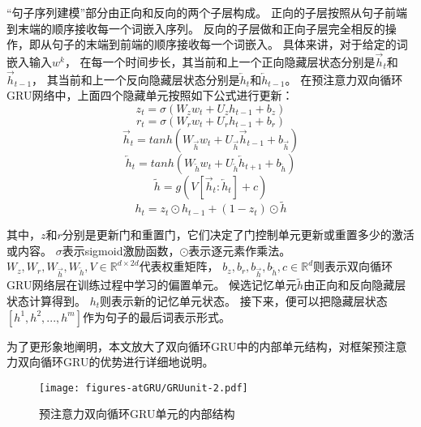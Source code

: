 “句子序列建模”部分由正向和反向的两个子层构成。
正向的子层按照从句子前端到末端的顺序接收每一个词嵌入序列。
反向的子层做和正向子层完全相反的操作，即从句子的末端到前端的顺序接收每一个词嵌入。
具体来讲，对于给定的词嵌入输入${w^k}$，
在每一个时间步长，其当前和上一个正向隐藏层状态分别是${\overrightarrow{h}_{t}}$和${\overrightarrow{h}_{t-1}}$，
其当前和上一个反向隐藏层状态分别是${\overleftarrow{h}_{t}}$和${\overleftarrow{h}_{t-1}}$。
在预注意力双向循环GRU网络中，上面四个隐藏单元按照如下公式进行更新：
\begin{equation}
z_{t}=\sigma\left(W_{z}w_{t}+U_{z}h_{t-1}+b_{z}\right)
\end{equation}
\begin{equation}
r_{t}=\sigma\left(W_{r}w_{t}+U_{r}h_{t-1}+b_{r}\right)
\end{equation}
\begin{equation}
\overrightarrow{h}_{t}=tanh\left(W_{\overrightarrow{h}}w_{t}+ U_{\overrightarrow{h}}\overrightarrow{h}_{t-1}+b_{\overrightarrow{h}}\right)
\end{equation}
\begin{equation}
\overleftarrow{h}_{t}=tanh\left(W_{\overleftarrow{h}}w_{t}+ U_{\overleftarrow{h}}\overleftarrow{h}_{t+1}+b_{\overleftarrow{h}}\right)
\end{equation}
\begin{equation}
\widetilde{h}=g\left(V\left[\overrightarrow{h}_{t}:\overleftarrow{h}_{t}\right]+c\right)
\label{eq:vc}
\end{equation}
\begin{equation}
h_{t}=z_{t}\odot h_{t-1}+\left(1-z_{t}\right)\odot\widetilde{h}
\end{equation}

其中，${z}$和${r}$分别是更新门和重置门，它们决定了门控制单元更新或重置多少的激活或内容。
${\sigma}$表示sigmoid激励函数，${\odot}$表示逐元素作乘法。
${W_{z},W_{r},W_{\overrightarrow{h}},W_{\overleftarrow{h}},V \in \mathbb{R}^{d\times2d}}$代表权重矩阵，
${b_{z},b_{r},b_{\overrightarrow{h}},b_{\overleftarrow{h}},c \in \mathbb{R}^{d}}$则表示双向循环GRU网络层在训练过程中学习的偏置单元。
候选记忆单元${\widetilde{h}}$由正向和反向隐藏层状态计算得到。
${h_{t}}$则表示新的记忆单元状态。
接下来，便可以把隐藏层状态${\left[h^{1},h^{2},...,h^{m}\right]}$作为句子的最后词表示形式。

为了更形象地阐明，本文放大了双向循环GRU中的内部单元结构，对框架预注意力双向循环GRU的优势进行详细地说明。
\begin{figure}[h!]
	\centering
	\texttt{[image: figures-atGRU/GRUunit-2.pdf]}
	\caption{预注意力双向循环GRU单元的内部结构}
	\label{fig:GRUunit-2}
\end{figure}

